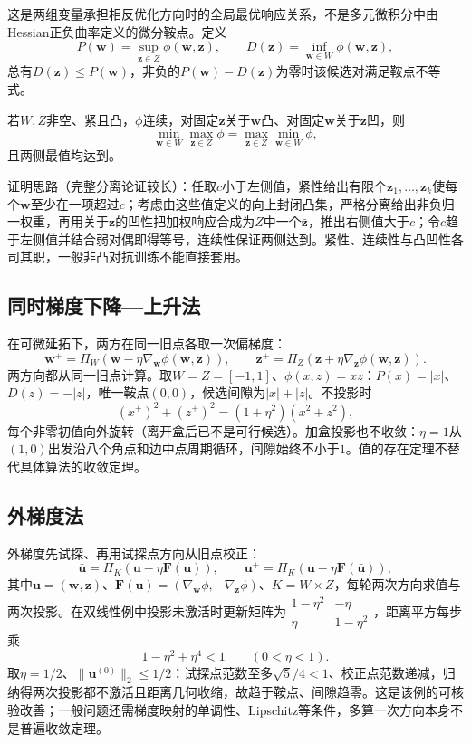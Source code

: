 这是两组变量承担相反优化方向时的全局最优响应关系，不是多元微积分中由Hessian正负曲率定义的微分鞍点。定义
\[
 P(\bm w)=\sup_{\bm z\in Z}\phi(\bm w,\bm z),\qquad
 D(\bm z)=\inf_{\bm w\in W}\phi(\bm w,\bm z),
\]
总有$D(\bm z)\leq P(\bm w)$，非负的$P(\bm w)-D(\bm z)$为零时该候选对满足鞍点不等式。

\begin{theorem}[紧凸凹条件下的最值交换]
若$W,Z$非空、紧且凸，$\phi$连续，对固定$\bm z$关于$\bm w$凸、对固定$\bm w$关于$\bm z$凹，则
\[
 \min_{\bm w\in W}\max_{\bm z\in Z}\phi
 =\max_{\bm z\in Z}\min_{\bm w\in W}\phi,
\]
且两侧最值均达到。
\end{theorem}

证明思路（完整分离论证较长）：任取$c$小于左侧值，紧性给出有限个$\bm z_1,\ldots,\bm z_k$使每个$\bm w$至少在一项超过$c$；考虑由这些值定义的向上封闭凸集，严格分离给出非负归一权重，再用关于$\bm z$的凹性把加权响应合成为$Z$中一个$\bar{\bm z}$，推出右侧值大于$c$；令$c$趋于左侧值并结合弱对偶即得等号，连续性保证两侧达到。紧性、连续性与凸凹性各司其职，一般非凸对抗训练不能直接套用。

\subsection{同时梯度下降—上升法}

在可微延拓下，两方在同一旧点各取一次偏梯度：
\[
 \bm w^+=\Pi_W(\bm w-\eta\nabla_{\bm w}\phi(\bm w,\bm z)),\qquad
 \bm z^+=\Pi_Z(\bm z+\eta\nabla_{\bm z}\phi(\bm w,\bm z)).
\]
两方向都从同一旧点计算。取$W=Z=[-1,1]$、$\phi(x,z)=xz$：$P(x)=|x|$、$D(z)=-|z|$，唯一鞍点$(0,0)$，候选间隙为$|x|+|z|$。不投影时
\[
 (x^+)^2+(z^+)^2=(1+\eta^2)(x^2+z^2),
\]
每个非零初值向外旋转（离开盒后已不是可行候选）。加盒投影也不收敛：$\eta=1$从$(1,0)$出发沿八个角点和边中点周期循环，间隙始终不小于$1$。值的存在定理不替代具体算法的收敛定理。

\subsection{外梯度法}

外梯度先试探、再用试探点方向从旧点校正：
\[
 \bar{\bm u}=\Pi_K(\bm u-\eta\bm F(\bm u)),\qquad
 \bm u^+=\Pi_K(\bm u-\eta\bm F(\bar{\bm u})),
\]
其中$\bm u=(\bm w,\bm z)$、$\bm F(\bm u)=(\nabla_{\bm w}\phi,-\nabla_{\bm z}\phi)$、$K=W\times Z$，每轮两次方向求值与两次投影。在双线性例中投影未激活时更新矩阵为$\begin{smallmatrix}1-\eta^2&-\eta\\ \eta&1-\eta^2\end{smallmatrix}$，距离平方每步乘
\[
 1-\eta^2+\eta^4<1\qquad(0<\eta<1).
\]
取$\eta=1/2$、$\|\bm u^{(0)}\|_2\leq1/2$：试探点范数至多$\sqrt5/4<1$、校正点范数递减，归纳得两次投影都不激活且距离几何收缩，故趋于鞍点、间隙趋零。这是该例的可核验改善；一般问题还需梯度映射的单调性、Lipschitz等条件，多算一次方向本身不是普遍收敛定理。

